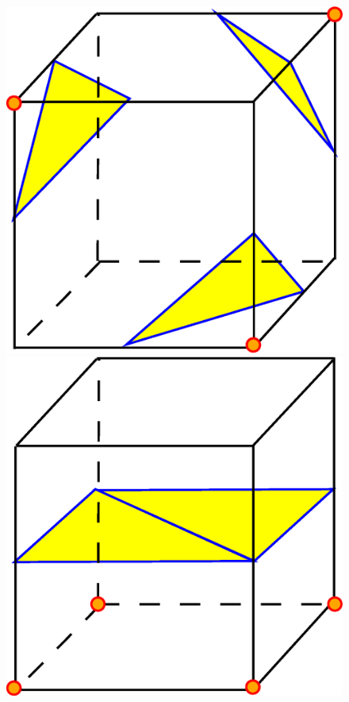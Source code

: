 \begin{figure}[ht]
\includegraphics[scale=0.15]{../img/mar_cub_case7.eps}
\includegraphics[scale=0.15]{../img/mar_cub_case8.eps}

\end{figure}
